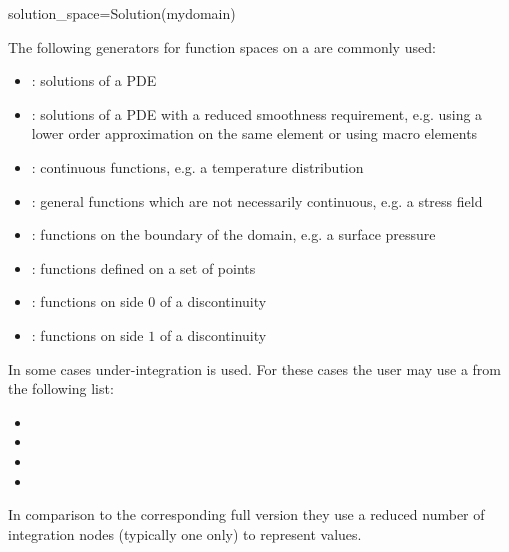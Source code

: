 \begin{python}
  solution_space=Solution(mydomain)
\end{python}
The following generators for function spaces on a \Domain {} are commonly used:
\begin{itemize}
\item {}: solutions of a PDE
\item {}: solutions of a PDE with a reduced
    smoothness requirement, e.g. using a lower order approximation on the same
    element or using macro elements
\item {}: continuous functions, e.g. a temperature distribution
\item {}: general functions which are not necessarily continuous, e.g. a stress field
\item {}: functions on the boundary of the domain, e.g. a surface pressure
\item {}: functions defined on a set of points
\item {}: functions on side $0$ of a discontinuity
\item {}: functions on side $1$ of a discontinuity
\end{itemize}
In some cases under-integration is used. For these cases the user may use a
\FunctionSpace from the following list:
\begin{itemize}
\item {}
\item {}
\item {}
\item {}
\end{itemize}
In comparison to the corresponding full version they use a reduced number of
integration nodes (typically one only) to represent values.

